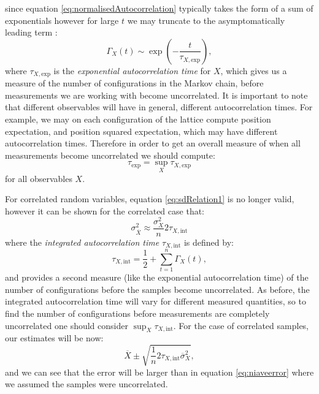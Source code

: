\documentclass[12pt]{article}
\begin{document}
            since equation \ref{eq:normalisedAutocorrelation} typically takes the form of a sum of exponentials however for  large $t$  we may truncate to the asymptomatically leading term \cite{gattringer_lang_2013}:
            \begin{equation}
                \Gamma_{X}\left(t\right)\sim\exp\left(-\frac{t}{\tau_{X,\text{exp}}}\right),
            \end{equation}
            where $\tau_{X,\text{exp}}$ is the \textit{exponential autocorrelation time} for $X$, which gives us a measure of the number of configurations in the Markov chain, before measurements we are working with become uncorrelated. It is important to note that different observables will have in general, different autocorrelation times. For example, we may on each configuration of the lattice compute position expectation, and position squared expectation, which may have different autocorrelation times. Therefore in order to get an overall measure of when all measurements become uncorrelated we should compute:
            \begin{equation}
                \tau_{\text{exp}}=\sup_{X} \tau_{X,\text{exp}}
            \end{equation}
            for all observables $X$.

            For correlated random variables, equation \ref{eq:sdRelation1} is no longer valid, however it can be shown for the correlated case \cite{gattringer_lang_2013} that:
            \begin{equation}
                \sigma_{\overline{X}}^2 \approx \frac{\sigma_X^2}{n} 2 \tau_{X,\text{int}}
            \end{equation}
            where the \textit{integrated autocorrelation time} $\tau_{X,\text{int}}$ is defined by:
            \begin{equation}
                \label{eq:integratedAutocorrelation}
                \tau_{X,\text{int}} = \frac{1}{2} + \sum_{t=1}^{n}\Gamma_{X}\left(t\right),
            \end{equation}
            and provides  a second measure (like the exponential autocorrelation time) of the number of configurations before the samples become uncorrelated. As before, the integrated autocorrelation time will vary for different measured quantities, so to find the number of configurations before measurements are completely uncorrelated one should consider $\sup_X{\tau_{X,\text{int}}}$. 
            For the case of correlated samples, our estimates will be now:
            \begin{equation}
                \label{eq:trueEstimate}
                \overline{X}\pm\sqrt{\frac{1}{n}2\tau_{X,\text{int}}\overline{\sigma}^{2}_{X}},
            \end{equation}
            and we can see that the error will be larger than in equation \ref{eq:niaveerror} where we assumed the samples were uncorrelated. 
\end{document}
